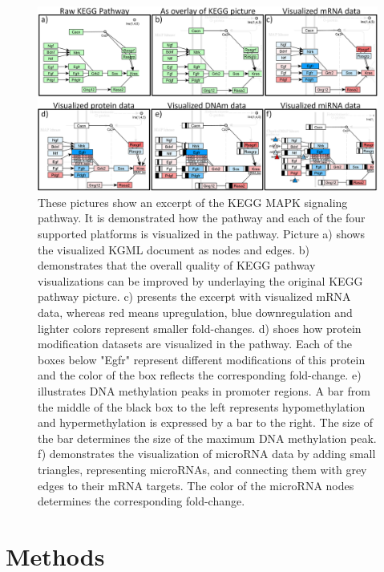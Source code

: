 \documentclass{bioinfo}
\begin{document}
\begin{figure}[t]
\centering
\includegraphics[width=1.0\textwidth]{figures/visualization-steps.png}
\caption{
These pictures show an excerpt of the KEGG MAPK signaling pathway. It is demonstrated how the pathway and each of the four supported platforms is visualized in the pathway. Picture a) shows the visualized KGML document as nodes and edges. b) demonstrates that the overall quality of KEGG pathway visualizations can be improved by underlaying the original KEGG pathway picture. c) presents the excerpt with visualized mRNA data, whereas red means upregulation, blue downregulation and lighter colors represent smaller fold-changes. d) shoes how protein modification datasets are visualized in the pathway. Each of the boxes below "Egfr" represent different modifications of this protein and the color of the box reflects the corresponding fold-change. e) illustrates DNA methylation peaks in promoter regions. A bar from the middle of the black box to the left represents hypomethylation and hypermethylation is expressed by a bar to the right. The size of the bar determines the size of the maximum DNA methylation peak. f) demonstrates the visualization of microRNA data by adding small triangles, representing microRNAs, and connecting them with grey edges to their mRNA targets. The color of the microRNA nodes determines the corresponding fold-change.
}
\label{fig:visualization_steps}
\end{figure}


\section{Methods}
\end{document}
